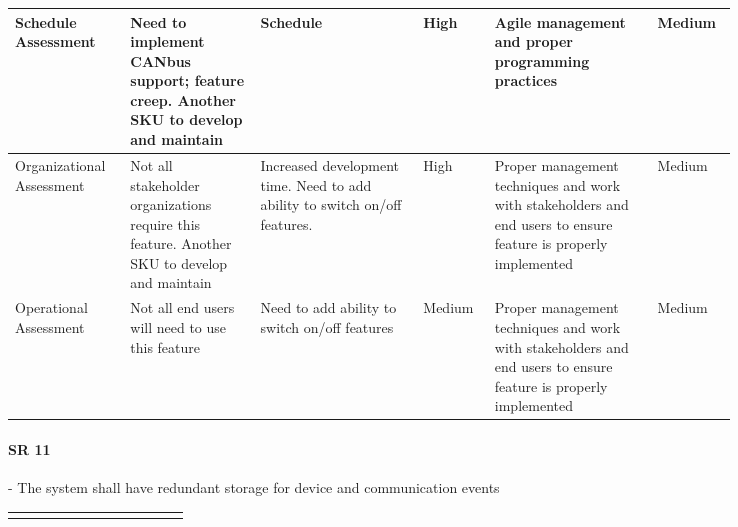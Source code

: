 \begin{landscape}
{\begin{longtable}{| p{0.12\linewidth} | p{0.16\linewidth} |  p{0.20\linewidth} | p{0.08\linewidth} | p{0.20\linewidth} | p{0.08\linewidth} |}
	\hline
	Schedule \newline Assessment & Need to implement CANbus support; feature creep. \newline Another SKU to develop and maintain & Schedule & \cellcolor{red} High & Agile management and proper programming practices & \cellcolor{yellow} Medium \\
	\hline
	Organizational \newline Assessment & Not all stakeholder organizations require this feature. \newline Another SKU to develop and maintain & Increased development time. \newline Need to add ability to switch on/off features. & \cellcolor{red} High & Proper management techniques and work with stakeholders and end users to ensure feature is properly implemented & \cellcolor{yellow} Medium \\
	\hline
	Operational \newline Assessment & Not all end users will need to use this feature & Need to add ability to switch on/off features & \cellcolor{yellow} Medium & Proper management techniques and work with stakeholders and end users to ensure feature is properly implemented & \cellcolor{yellow} Medium
	\label{tab:sr10_feasibility}
\end{longtable}
}
\newpage




\paragraph*{SR 11} - The system shall have redundant storage for device and communication events

{\fontsize{8pt}{8pt}\selectfont
\begin{longtable}{| p{0.12\linewidth} | p{0.16\linewidth} |  p{0.20\linewidth} | p{0.08\linewidth} | p{0.20\linewidth} | p{0.08\linewidth} |}
	\hline \endlastfoot
	

\end{longtable}}
\end{landscape}
